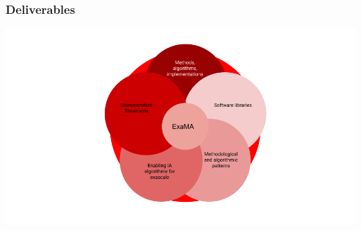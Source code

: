 \begin{frame}
  \frametitle{Deliverables}
\vspace*{-0.5cm}
  \begin{center}
    \includegraphics[width=\linewidth]{../../figures/exama-deliverables.png}
  \end{center}
% 


\end{frame}


